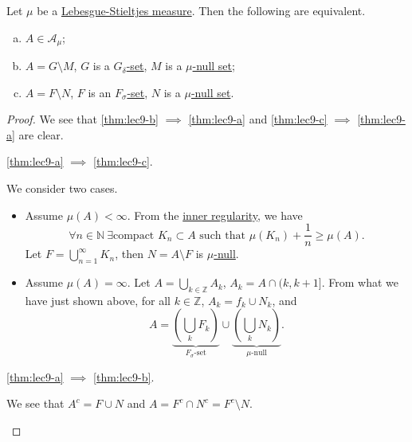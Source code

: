 \begin{theorem}\label{thm:lec9}
	Let \(\mu \) be a \hyperref[def:Lebesgue-Stieltjes-measure]{Lebesgue-Stieltjes measure}. Then the following are equivalent.
	\begin{enumerate}[(a)]
		\item\label{thm:lec9-a} \(A\in \mathcal{A} _\mu \);
		\item\label{thm:lec9-b} \(A = G\setminus M\), \(G\) is a \hyperref[def:G-delta-set]{\(G_{\delta}\)-set}, \(M\) is a \hyperref[def:null-set]{\(\mu\)-null set};
		\item\label{thm:lec9-c} \(A = F\setminus N\), \(F\) is an \hyperref[def:F-sigma-set]{\(F_{\sigma}\)-set}, \(N\) is a \hyperref[def:null-set]{\(\mu\)-null set}.
	\end{enumerate}
\end{theorem}
\begin{proof}
	We see that \autoref{thm:lec9-b} \(\implies \) \autoref{thm:lec9-a} and \autoref{thm:lec9-c} \(\implies \) \autoref{thm:lec9-a} are clear.
	\begin{claim}
		\autoref{thm:lec9-a} \(\implies \) \autoref{thm:lec9-c}.
	\end{claim}
	\begin{explanation}
		We consider two cases.
		\begin{itemize}
			\item Assume \(\mu (A)<\infty \). From the \hyperref[thm:inner-regularity]{inner regularity}, we have
			      \[
				      \forall n\in\mathbb{N} \ \exists \text{compact }K_{n}\subset A\text{ such that } \mu (K_{n}) + \frac{1}{n} \geq \mu (A).
			      \]
			      Let \(F = \bigcup_{n=1}^{\infty} K_{n}\), then \(N = A\setminus F\) is \hyperref[def:null-set]{\(\mu\)-null}.
			\item Assume \(\mu (A) = \infty \). Let \(A = \bigcup_{k\in\mathbb{Z} } A_{k}\), \(A_{k} = A\cap (k, k+1]\). From what we have just shown above, for all \(k \in \mathbb{Z} \), \(A_k = f_k \cup N_k\), and
			      \[
				      A = \underbrace{\left(\bigcup_{k}F_{k} \right)}_{\hyperref[def:F-sigma-set]{F_{\sigma}\text{-set}}}\cup \underbrace{\left(\bigcup_{k}N_{k}\right)}_{\hyperref[def:null-set]{\mu\text{-null}}}.
			      \]
		\end{itemize}
	\end{explanation}

	\begin{claim}
		\autoref{thm:lec9-a} \(\implies \) \autoref{thm:lec9-b}.
	\end{claim}
	\begin{explanation}
		We see that \(A^{c} = F\cup N\) and \(A = F^{c} \cap N^{c} = F^{c} \setminus N\).
	\end{explanation}
\end{proof}

